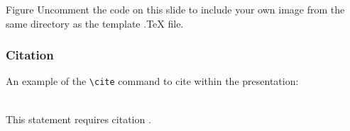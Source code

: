 
\begin{frame}{Figure}
    Uncomment the code on this slide to include your own image from the same directory as the template .TeX file.
\end{frame}


\begin{frame}[fragile] %
    \frametitle{Citation}
    An example of the \verb|\cite| command to cite within the presentation:\\~

    This statement requires citation \cite{p1}.
\end{frame}
